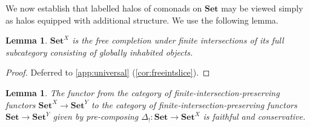 \documentclass[11pt, oneside, article]{memoir}
\theoremstyle{plain}
\newtheorem{lemma}[theorem]{Lemma}
\theoremstyle{definition}
\theoremstyle{remark}
\DeclareMathOperator{\ophelper}{op}
\DeclarePairedDelimiter{\abs}{\lvert}{\rvert}
\newcommand{\op}{^{\ophelper}}
\newcommand{\bang}{\mathrm{!}}
\newcommand{\namedcat}[1]{\mathbf{#1}}
\newcommand{\Set}{\namedcat{Set}}
\newcommand{\Con}{\namedcat{Cmd}^\natural}
\newcommand{\ConSet}{\Con}
\newcommand{\Fam}{\mathbf{Fam}}
\newcommand{\pts}[1]{{\abs{#1}}}
\newcommand{\one}[1]{\pts{#1}}
\newcommand{\reindex}[1]{\Delta_{#1}}
\newcommand{\slicer}{\Delta_\bang}
\newcommand{\fun}[2]{{#2}^{#1}}
\newcommand{\End}[1]{\fun{#1}{#1}}
\newcommand{\SetSet}{\End{\Set}}
\newcommand{\cmnd}[1]{{#1}}
\newcommand{\xX}{X}
\newcommand{\cC}{\cmnd{C}}
\newcommand{\cD}{\cmnd{D}}
\newcommand{\SetpC}{\Set^\pts{\cC}}
\newcommand{\SetpD}{\Set^\pts{\cD}}
\begin{document}
We now establish that labelled halos of comonads on $\Set$ may be
viewed simply as halos equipped with additional structure. We
use the following lemma.

\begin{lemma}\label{lem:freeintslice}
  $\Set^\xX$ is the free completion under finite intersections of its
  full subcategory consisting of globally inhabited objects.
\end{lemma}
\begin{proof}
  Deferred to \cref{app:universal} (\cref{cor:freeintslice}).
\end{proof}

\begin{lemma}\label{prop:faithfulhalo}
  The functor from the category of finite-intersection-preserving
  functors $\Set^\xX \to \Set^Y$ to the category of
  finite-intersection-preserving functors $\Set \to \Set^Y$ given by
  pre-composing $\slicer \colon \Set \to \Set^\xX$
  is faithful and conservative.

\end{lemma}
\end{document}
